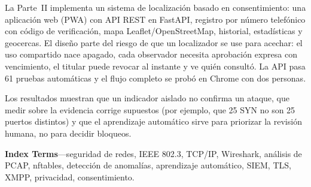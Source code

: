 La Parte~II implementa un sistema de localización basado en consentimiento: una aplicación web (PWA) con API REST en FastAPI, registro por número telefónico con código de verificación, mapa Leaflet/OpenStreetMap, historial, estadísticas y geocercas. El diseño parte del riesgo de que un localizador se use para acechar: el uso compartido nace apagado, cada observador necesita aprobación expresa con vencimiento, el titular puede revocar al instante y ve quién consultó. La API pasa 61 pruebas automáticas y el flujo completo se probó en Chrome con dos personas.

Los resultados muestran que un indicador aislado no confirma un ataque, que medir sobre la evidencia corrige supuestos (por ejemplo, que 25 SYN no son 25 puertos distintos) y que el aprendizaje automático sirve para priorizar la revisión humana, no para decidir bloqueos.

\vspace{0.6cm}
\noindent\textbf{Index Terms}---seguridad de redes, IEEE 802.3, TCP/IP, Wireshark, análisis de PCAP, nftables, detección de anomalías, aprendizaje automático, SIEM, TLS, XMPP, privacidad, consentimiento.
\par\vspace{0.8cm}
\noindent{}
